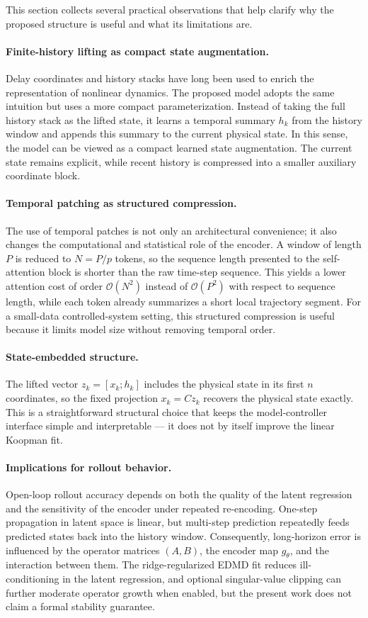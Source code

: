 \documentclass[journal]{IEEEtran}
\begin{document}
This section collects several practical observations that help clarify why the proposed structure is useful and what its limitations are.

\paragraph{Finite-history lifting as compact state augmentation.}
Delay coordinates and history stacks have long been used to enrich the representation of nonlinear dynamics. The proposed model adopts the same intuition but uses a more compact parameterization. Instead of taking the full history stack as the lifted state, it learns a temporal summary $h_k$ from the history window and appends this summary to the current physical state. In this sense, the model can be viewed as a compact learned state augmentation. The current state remains explicit, while recent history is compressed into a smaller auxiliary coordinate block.

\paragraph{Temporal patching as structured compression.}
The use of temporal patches is not only an architectural convenience; it also changes the computational and statistical role of the encoder. A window of length $P$ is reduced to $N=P/p$ tokens, so the sequence length presented to the self-attention block is shorter than the raw time-step sequence. This yields a lower attention cost of order $\mathcal{O}(N^2)$ instead of $\mathcal{O}(P^2)$ with respect to sequence length, while each token already summarizes a short local trajectory segment. For a small-data controlled-system setting, this structured compression is useful because it limits model size without removing temporal order.

\paragraph{State-embedded structure.}
The lifted vector $z_k=[x_k;h_k]$ includes the physical state in its first $n$ coordinates, so the fixed projection $x_k=Cz_k$ recovers the physical state exactly. This is a straightforward structural choice that keeps the model-controller interface simple and interpretable — it does not by itself improve the linear Koopman fit.

\paragraph{Implications for rollout behavior.}
Open-loop rollout accuracy depends on both the quality of the latent regression and the sensitivity of the encoder under repeated re-encoding. One-step propagation in latent space is linear, but multi-step prediction repeatedly feeds predicted states back into the history window. Consequently, long-horizon error is influenced by the operator matrices $(A,B)$, the encoder map $g_\theta$, and the interaction between them. The ridge-regularized EDMD fit reduces ill-conditioning in the latent regression, and optional singular-value clipping can further moderate operator growth when enabled, but the present work does not claim a formal stability guarantee.
\end{document}
